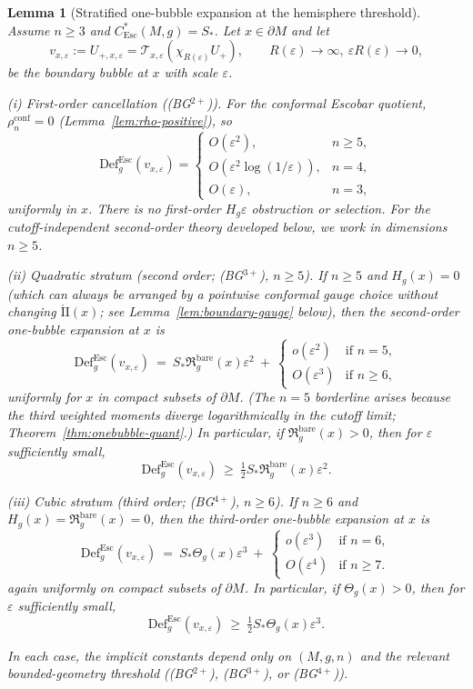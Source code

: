 \documentclass[11pt,reqno,a4paper]{amsart}
\numberwithin{equation}{section}
\newcommand{\Def}{\mathrm{Def}}
\theoremstyle{plain}
\newtheorem{lemma}[theorem]{Lemma}
\newcommand{\Esc}{\ensuremath{\mathrm{Esc}}}
\theoremstyle{remark}
\theoremstyle{plain}
\begin{document}
\begin{lemma}[Stratified one-bubble expansion at the hemisphere threshold]\label{lem:esc-scale-law-stratified}
Assume $n\ge3$ and $C^*_{\Esc}(M,g)=S_\ast$. Let $x\in\partial M$ and let
\[
v_{x,\varepsilon}:=U_{+,x,\varepsilon}=\mathcal T_{x,\varepsilon}(\chi_{R(\varepsilon)}U_+),
\qquad R(\varepsilon)\to\infty,\ \varepsilon R(\varepsilon)\to0,
\]
be the boundary bubble at $x$ with scale $\varepsilon$.

\emph{(i) First-order cancellation (\textup{(BG$^{2+}$)}).} For the conformal Escobar quotient,
$\rho_n^{\mathrm{conf}}=0$ (Lemma~\ref{lem:rho-positive}), so
\[
\Def^{\Esc}_g(v_{x,\varepsilon})
=
\begin{cases}
O(\varepsilon^2), & n\ge5,\\[1mm]
O\!\left(\varepsilon^2\log(1/\varepsilon)\right), & n=4,\\[1mm]
O(\varepsilon), & n=3,
\end{cases}
\]
uniformly in $x$. There is no first-order $H_g\varepsilon$ obstruction or selection.
For the cutoff-independent second-order theory developed below, we work in
dimensions $n\ge5$.


\emph{(ii) Quadratic stratum (second order; \textup{(BG$^{3+}$)}, $n\ge5$).} If $n\ge5$ and $H_g(x)=0$ (which can always be arranged by a pointwise conformal gauge choice without changing $\mathring{\mathrm{II}}(x)$; see Lemma~\ref{lem:boundary-gauge} below), then the second-order one-bubble expansion at $x$ is
\[
\Def^{\Esc}_g(v_{x,\varepsilon})
\ =\ S_\ast\mathfrak R_g^{\mathrm{bare}}(x)\varepsilon^2\ +\ \begin{cases}o(\varepsilon^2)&\text{if }n=5,\\O(\varepsilon^3)&\text{if }n\ge6,\end{cases}
\]
uniformly for $x$ in compact subsets of $\partial M$.
(The $n=5$ borderline arises because the third weighted moments diverge logarithmically
in the cutoff limit; Theorem~\ref{thm:onebubble-quant}.)
In particular, if $\mathfrak R_g^{\mathrm{bare}}(x)>0$, then for $\varepsilon$ sufficiently small,
\[
\Def^{\Esc}_g(v_{x,\varepsilon})
\ \ge\ \tfrac12 S_\ast\mathfrak R_g^{\mathrm{bare}}(x)\varepsilon^2.
\]

\emph{(iii) Cubic stratum (third order; \textup{(BG$^{4+}$)}, $n\ge6$).} If $n\ge6$ and $H_g(x)=\mathfrak R_g^{\mathrm{bare}}(x)=0$, then the third-order one-bubble expansion at $x$ is
\[
\Def^{\Esc}_g(v_{x,\varepsilon})
\ =\ S_\ast\Theta_g(x)\varepsilon^3\ +\ \begin{cases}o(\varepsilon^3)&\text{if }n=6,\\O(\varepsilon^4)&\text{if }n\ge7.\end{cases}
\]
again uniformly on compact subsets of $\partial M$. In particular, if $\Theta_g(x)>0$, then for $\varepsilon$ sufficiently small,
\[
\Def^{\Esc}_g(v_{x,\varepsilon})
\ \ge\ \tfrac12S_\ast\Theta_g(x)\varepsilon^3.
\]

In each case, the implicit constants depend only on $(M,g,n)$ and the relevant bounded-geometry threshold (\textup{(BG$^{2+}$)}, \textup{(BG$^{3+}$)}, or \textup{(BG$^{4+}$)}).
\end{lemma}
\end{document}
